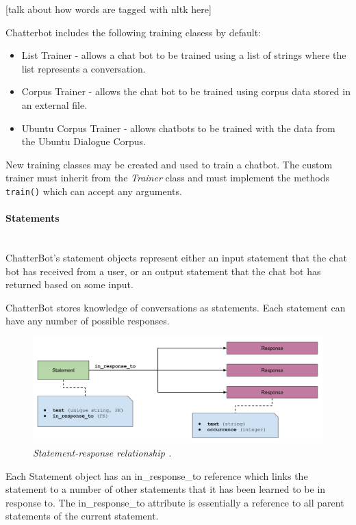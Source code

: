 \documentclass[12pt,a4paper]{article}
\newcommand{\myparagraph}[1]{\paragraph{#1}\mbox{}\\}
\newcommand{\captionstyle}[1] {
    \small{\textit{#1}}
}
\begin{document}
[talk about how words are tagged with nltk here]

Chatterbot includes the following training clasess by default:
\begin{itemize}
    \item List Trainer - allows a chat bot to be trained using a list of strings where the list represents a conversation.
    \item Corpus Trainer - allows the chat bot to be trained using corpus data stored in an external file.
    \item Ubuntu Corpus Trainer - allows chatbots to be trained with the data from the Ubuntu Dialogue Corpus.
\end{itemize}

New training classes may be created and used to train a chatbot. The custom trainer must inherit from the \textit{Trainer} class and must implement the methods \texttt{train()} which can accept any arguments.

\myparagraph{Statements}
ChatterBot’s statement objects represent either an input statement that the chat bot has received from a user, or an output statement that the chat bot has returned based on some input.

ChatterBot stores knowledge of conversations as statements. Each statement can have any number of possible responses.

\begin{figure}[!htb]%
    \centering
    \includegraphics[width=1.0\columnwidth]{statement-response-relationship}%
    \caption{\captionstyle{Statement-response relationship \cite{Chatterbot:online}.}}%
    \label{fig:statement-response-relationship}%
\end{figure}

Each Statement object has an in\_response\_to reference which links the statement to a number of other statements that it has been learned to be in response to. The in\_response\_to attribute is essentially a reference to all parent statements of the current statement.
\end{document}

